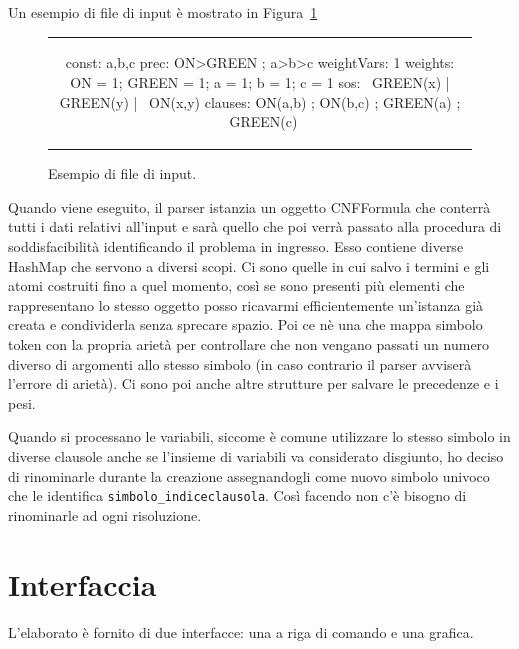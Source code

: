 \documentclass[a4paper,11pt]{article} %
\newcommand{\sintassi}{\texttt}
\newcommand{\classe}{\textsf}
\newenvironment{myfigure}[2]
  {\newcommand{\didascalia}{\caption{#1}}%
   \newcommand{\etichetta}{\label{#2}}%
   \begin{figure}[h!]\centering}
  {\didascalia\etichetta\end{figure}}
\begin{document}
Un esempio di file di input è mostrato in Figura~\ref{fig: esempio input}
\begin{myfigure}{Esempio di file di input.}{fig: esempio input}
\begin{tabular}{c}
\begin{codice}
const: a,b,c
prec: ON>GREEN ; a>b>c
weightVars: 1
weights: ON = 1; GREEN = 1; a = 1; b = 1; c = 1
sos: ~GREEN(x) | GREEN(y) | ~ON(x,y)
clauses: ON(a,b) ; ON(b,c) ; GREEN(a) ; ~GREEN(c)
\end{codice}
\end{tabular}
\end{myfigure}

Quando viene eseguito, il parser istanzia un oggetto \classe{CNFFormula} che
conterrà tutti i dati relativi all'input e sarà quello che poi
verrà passato alla procedura di soddisfacibilità identificando il
problema in ingresso. 
Esso contiene diverse \classe{HashMap} che servono a diversi scopi.
Ci sono quelle in cui salvo i termini e gli atomi costruiti fino a quel momento, 
così se sono presenti più elementi che rappresentano
lo stesso oggetto posso ricavarmi efficientemente un'istanza già creata e 
condividerla senza
sprecare spazio.
Poi ce nè una che mappa simbolo token con la propria arietà per controllare 
che non vengano passati 
un numero diverso di argomenti allo stesso simbolo
(in caso contrario il parser avviserà l'errore di arietà).
Ci sono poi anche altre
strutture per salvare le precedenze e i pesi.
 
Quando si processano le variabili, siccome è comune utilizzare lo stesso simbolo
in diverse clausole anche se l'insieme di variabili va considerato disgiunto,
ho deciso di rinominarle durante la creazione 
assegnandogli come nuovo simbolo univoco che le identifica
\sintassi{simbolo\_indiceclausola}.
Così facendo non c'è bisogno di rinominarle ad ogni risoluzione.


\section{Interfaccia}\label{sec: interfaccia}
L'elaborato è fornito di due interfacce: una a 
{riga di comando} e una 
{grafica}.
\end{document}

